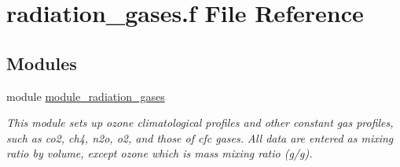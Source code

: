 \hypertarget{radiation__gases_8f}{}\section{radiation\+\_\+gases.\+f File Reference}
\label{radiation__gases_8f}
\subsection*{Modules}
\begin{DoxyCompactItemize}
\item 
module \hyperlink{namespacemodule__radiation__gases}{module\+\_\+radiation\+\_\+gases}
\begin{DoxyCompactList}\small\item\em This module sets up ozone climatological profiles and other constant gas profiles, such as co2, ch4, n2o, o2, and those of cfc gases. All data are entered as mixing ratio by volume, except ozone which is mass mixing ratio (g/g). \end{DoxyCompactList}\end{DoxyCompactItemize}
